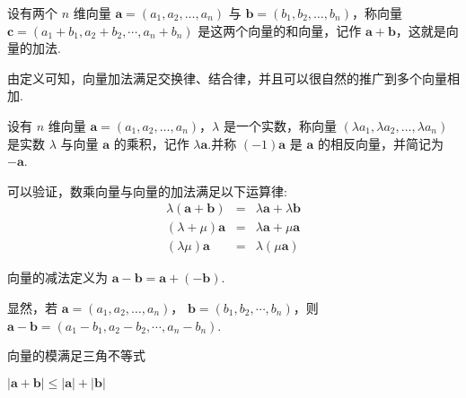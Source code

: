 \begin{definition}
  设有两个 $n$ 维向量 $\bm{a}= (a_1, a_2 , \ldots, a_n)$
  与 $\bm{b}= (b_1, b_2, \ldots, b_n)$，称向量 $\bm{c}= (a_1
  + b_1, a_2 + b_2, \cdots, a_n + b_n)$
  是这两个向量的和向量，记作
  $\bm{a}+\bm{b}$，这就是向量的加法.
\end{definition}

由定义可知，向量加法满足交换律、结合律，并且可以很自然的推广到多个向量相加.

\begin{definition}
  设有 $n$ 维向量 $\bm{a}= (a_1, a_2 , \ldots,
  a_n)$，$\lambda$ 是一个实数，称向量 $(\lambda a_1, \lambda a_2,
  \ldots, \lambda a_n)$ 是实数 $\lambda$ 与向量 $\bm{a}$
  的乘积，记作 $\lambda \bm{a}$.并称 $(- 1) \bm{a}$ 是
  $\bm{a}$ 的相反向量，并简记为 $-\bm{a}$.
\end{definition}

可以验证，数乘向量与向量的加法满足以下运算律:
\begin{eqnarray*}
  \lambda (\bm{a}+\bm{b}) & = & \lambda \bm{a}+ \lambda
  \bm{b}\\
  (\lambda + \mu) \bm{a} & = & \lambda \bm{a}+ \mu \bm{a}\\
  (\lambda \mu) \bm{a} & = & \lambda (\mu \bm{a})
\end{eqnarray*}
\begin{definition}
  向量的减法定义为 $\bm{a}-\bm{b}=\bm{a}+
  (-\bm{b})$.
\end{definition}

显然，若 $\bm{a}= (a_1, a_2 , \ldots, a_n)$， $\bm{b}= (b_1, b_2, \cdots, b_n)$，则 $\bm{a}-\bm{b}= (a_1 - b_1, a_2 - b_2, \cdots, a_n - b_n)$.

向量的模满足三角不等式

\begin{theorem}
  $| \bm{a}+\bm{b} | \leqslant | \bm{a} | + | \bm{b}|$
\end{theorem}


